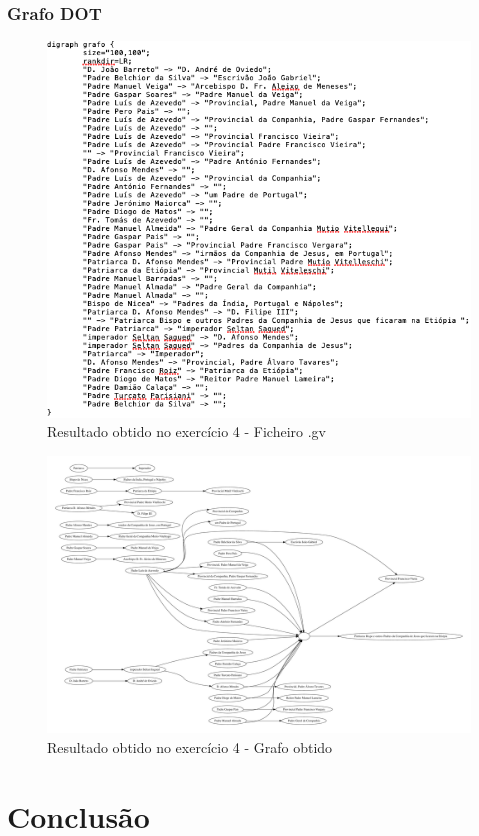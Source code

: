 \documentclass[11pt,a4paper]{report}
\begin{document}
\subsection{Grafo DOT}
\begin{figure}[h]
\includegraphics[width=\textwidth]{ex41}
\caption{Resultado obtido no exercício 4 - Ficheiro .gv}
\end{figure}

\begin{figure}[h]
\includegraphics[scale=0.23]{grafo}
\caption{Resultado obtido no exercício 4 - Grafo obtido}
\end{figure}
\chapter{Conclusão}
\end{document}

